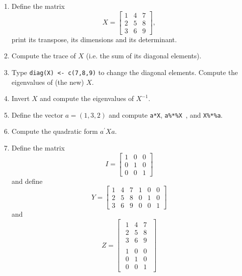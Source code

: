 \documentclass{article}
\begin{document}
\begin{enumerate}
\item Define the matrix%
\begin{equation*}
X=\left[ 
\begin{array}{lll}
1 & 4 & 7 \\ 
2 & 5 & 8 \\ 
3 & 6 & 9%
\end{array}%
\right] ,
\end{equation*}%
print its transpose, its dimensions and its determinant.

\item Compute the trace of $X$ (i.e. the sum of its diagonal elements).

\item Type \texttt{diag(X) <- c(7,8,9)} to change the diagonal
elements. Compute the eigenvalues of (the new) $X$. %

\item Invert $X$ and compute the eigenvalues of $X^{-1}$.

\item Define the vector $a=(1,3,2)$ and compute \texttt{a*X}, \texttt{a\%*\%X%
}, and \texttt{X\%*\%a}.

\item Compute the quadratic form $a^{\prime }Xa$.

\item Define the matrix%
\begin{equation*}
I=\left[ 
\begin{array}{lll}
1 & 0 & 0 \\ 
0 & 1 & 0 \\ 
0 & 0 & 1%
\end{array}%
\right]
\end{equation*}%
and define%
\begin{equation*}
Y=\left[ 
\begin{array}{lll}
1 & 4 & 7 \\ 
2 & 5 & 8 \\ 
3 & 6 & 9%
\end{array}%
\begin{array}{lll}
1 & 0 & 0 \\ 
0 & 1 & 0 \\ 
0 & 0 & 1%
\end{array}%
\right]
\end{equation*}%
and%
\begin{equation*}
Z=\left[ 
\begin{array}{c}
\begin{array}{lll}
1 & 4 & 7 \\ 
2 & 5 & 8 \\ 
3 & 6 & 9%
\end{array}
\\ 
\begin{array}{lll}
1 & 0 & 0 \\ 
0 & 1 & 0 \\ 
0 & 0 & 1%
\end{array}%
\end{array}%
\right]
\end{equation*}


\end{enumerate}
\end{document}
